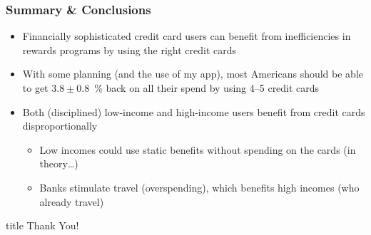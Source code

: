 \begin{frame}
    \frametitle{Summary \& Conclusions}
    \begin{itemize}
        \item Financially sophisticated credit card users can benefit from inefficiencies in rewards programs by using the right credit cards
        \bigskip
        \item With some planning (and the use of my app), most Americans should be able to get $3.8\pm0.8$~\% back on all their spend by using 4--5 credit cards
        \bigskip
        \item Both (disciplined) low-income and high-income users benefit from credit cards disproportionally
        \begin{itemize}
            \item Low incomes could use static benefits without spending on the cards (in theory\dots)
            \item Banks stimulate travel (overspending), which benefits high incomes (who already travel) 
        \end{itemize}
    \end{itemize}
\end{frame}

\begin{frame}
    \vfill
    \centering
    \begin{beamercolorbox}[sep=8pt,center,shadow=true,rounded=true]{title}
      Thank You!
    \end{beamercolorbox}
    \vfill
\end{frame}




%     
%     

